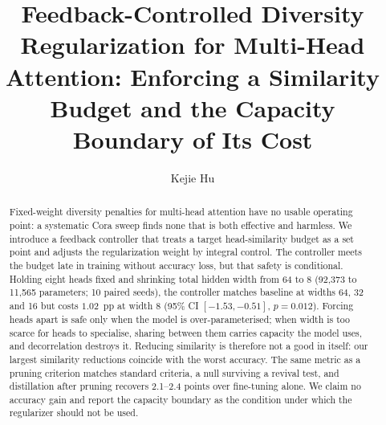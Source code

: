 \documentclass{ws-ijprai}
\begin{document}

\catchline{}{}{}{}{}

\title{Feedback-Controlled Diversity Regularization for Multi-Head
Attention: Enforcing a Similarity Budget and the Capacity Boundary of Its Cost}

\author{Kejie Hu}

\address{Wuhan City College, Wuhan Hubei 430083, CN\\
}

\maketitle

\begin{history}
\end{history}

\begin{abstract}
Fixed-weight diversity penalties for multi-head attention have no usable
operating point: a systematic Cora sweep finds none that is both effective and
harmless. We introduce a feedback controller that treats a target
head-similarity budget as a set point and adjusts the regularization weight by
integral control. The controller meets the budget late in training without
accuracy loss, but that safety is conditional. Holding eight heads fixed and
shrinking total hidden width from 64 to 8 (92{,}373 to 11{,}565 parameters; 10
paired seeds), the controller matches baseline at widths 64, 32 and 16 but
costs $1.02$~pp at width 8 (95\% CI $[-1.53, -0.51]$, $p=0.012$). Forcing heads
apart is safe only when the model is over-parameterised; when width is too
scarce for heads to specialise, sharing between them carries capacity the model
uses, and decorrelation destroys it. Reducing similarity is therefore not a
good in itself: our largest similarity reductions coincide with the worst
accuracy. The same metric as a pruning criterion matches standard criteria, a
null surviving a revival test, and distillation after pruning recovers
2.1--2.4 points over fine-tuning alone. We claim no accuracy gain and report
the capacity boundary as the condition under which the regularizer should not
be used.
\end{abstract}

\end{document}
